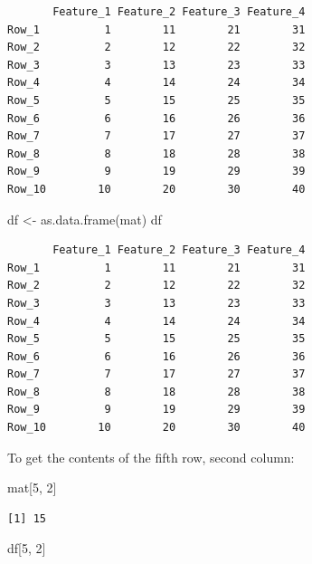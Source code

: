 \documentclass[
]{book}
\newenvironment{Shaded}{\begin{snugshade}}{\end{snugshade}}
\newcommand{\DecValTok}[1]{\textcolor[rgb]{0.00,0.00,0.81}{#1}}
\newcommand{\FunctionTok}[1]{\textcolor[rgb]{0.00,0.00,0.00}{#1}}
\newcommand{\NormalTok}[1]{#1}
\newcommand{\OtherTok}[1]{\textcolor[rgb]{0.56,0.35,0.01}{#1}}
\begin{document}
\begin{verbatim}
       Feature_1 Feature_2 Feature_3 Feature_4
Row_1          1        11        21        31
Row_2          2        12        22        32
Row_3          3        13        23        33
Row_4          4        14        24        34
Row_5          5        15        25        35
Row_6          6        16        26        36
Row_7          7        17        27        37
Row_8          8        18        28        38
Row_9          9        19        29        39
Row_10        10        20        30        40
\end{verbatim}

\begin{Shaded}
\begin{Highlighting}[]
\NormalTok{df }\OtherTok{\textless{}{-}} \FunctionTok{as.data.frame}\NormalTok{(mat)}
\NormalTok{df}
\end{Highlighting}
\end{Shaded}

\begin{verbatim}
       Feature_1 Feature_2 Feature_3 Feature_4
Row_1          1        11        21        31
Row_2          2        12        22        32
Row_3          3        13        23        33
Row_4          4        14        24        34
Row_5          5        15        25        35
Row_6          6        16        26        36
Row_7          7        17        27        37
Row_8          8        18        28        38
Row_9          9        19        29        39
Row_10        10        20        30        40
\end{verbatim}

To get the contents of the fifth row, second column:

\begin{Shaded}
\begin{Highlighting}[]
\NormalTok{mat[}\DecValTok{5}\NormalTok{, }\DecValTok{2}\NormalTok{]}
\end{Highlighting}
\end{Shaded}

\begin{verbatim}
[1] 15
\end{verbatim}

\begin{Shaded}
\begin{Highlighting}[]
\NormalTok{df[}\DecValTok{5}\NormalTok{, }\DecValTok{2}\NormalTok{]}
\end{Highlighting}
\end{Shaded}
\end{document}
